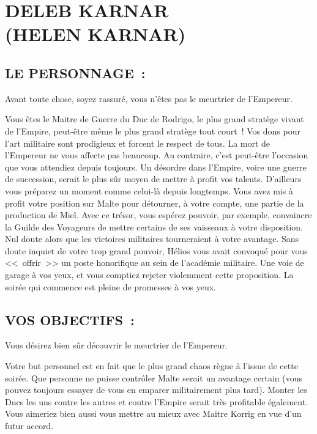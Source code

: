 \documentclass[14pt,twocolumn]{extarticle}
\begin{document}
\section{DELEB KARNAR\\(HELEN KARNAR)}

\subsection{LE PERSONNAGE~:}

Avant toute chose, soyez rassuré, vous n'êtes pas le meurtrier de l'Empereur.

Vous êtes le Maitre de Guerre du Duc de Rodrigo, le plus grand stratège vivant
de l'Empire, peut-être même le plus grand stratège tout court~! Vos dons pour
l'art militaire sont prodigieux et forcent le respect de tous. La mort de
l'Empereur ne vous affecte pas beaucoup. Au contraire, c'est peut-être
l'occasion que vous attendiez depuis toujours. Un désordre dans l'Empire, voire
une guerre de succession, serait le plus sûr moyen de mettre à profit vos
talents. D'ailleurs vous préparez un moment comme celui-là depuis longtemps.
Vous avez mis à profit votre position sur Malte pour détourner, à votre compte,
une partie de la production de Miel. Avec ce trésor, vous espérez pouvoir, par
exemple, convaincre la Guilde des Voyageurs de mettre certains de ses vaisseaux
à votre disposition. Nul doute alors que les victoires militaires tourneraient
à votre avantage. Sans doute inquiet de votre trop grand pouvoir, Hélios vous
avait convoqué pour vous <<~offrir~>> un poste honorifique au sein de
l'académie militaire. Une voie de garage à vos yeux, et vous comptiez rejeter
violemment cette proposition. La soirée qui commence est pleine de promesses à
vos yeux.

\subsection{VOS OBJECTIFS~:}

Vous désirez bien sûr découvrir le meurtrier de l'Empereur.

Votre but personnel est en fait que le plus grand chaos règne à l'issue de
cette soirée. Que personne ne puisse contrôler Malte serait un avantage certain
(vous pouvez toujours essayer de vous en emparer militairement plus tard).
Monter les Ducs les uns contre les autres et contre l'Empire serait très
profitable également. Vous aimeriez bien aussi vous mettre au mieux avec
Maitre Korrig en vue d'un futur accord.
\end{document}
